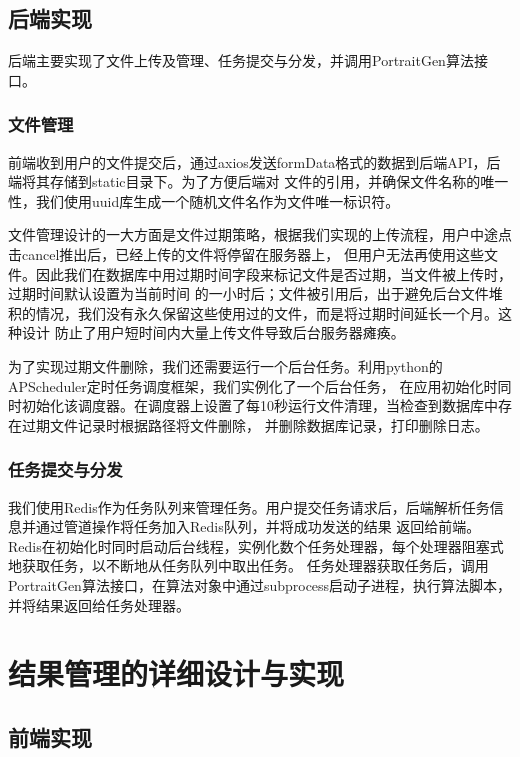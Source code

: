 \subsection{后端实现}

后端主要实现了文件上传及管理、任务提交与分发，并调用PortraitGen算法接口。

\subsubsection{文件管理}

前端收到用户的文件提交后，通过axios发送formData格式的数据到后端API，后端将其存储到static目录下。为了方便后端对
文件的引用，并确保文件名称的唯一性，我们使用uuid库生成一个随机文件名作为文件唯一标识符。

文件管理设计的一大方面是文件过期策略，根据我们实现的上传流程，用户中途点击cancel推出后，已经上传的文件将停留在服务器上，
但用户无法再使用这些文件。因此我们在数据库中用过期时间字段来标记文件是否过期，当文件被上传时，过期时间默认设置为当前时间
的一小时后；文件被引用后，出于避免后台文件堆积的情况，我们没有永久保留这些使用过的文件，而是将过期时间延长一个月。这种设计
防止了用户短时间内大量上传文件导致后台服务器瘫痪。

为了实现过期文件删除，我们还需要运行一个后台任务。利用python的APScheduler定时任务调度框架，我们实例化了一个后台任务，
在应用初始化时同时初始化该调度器。在调度器上设置了每10秒运行文件清理，当检查到数据库中存在过期文件记录时根据路径将文件删除，
并删除数据库记录，打印删除日志。

\subsubsection{任务提交与分发}

我们使用Redis作为任务队列来管理任务。用户提交任务请求后，后端解析任务信息并通过管道操作将任务加入Redis队列，并将成功发送的结果
返回给前端。Redis在初始化时同时启动后台线程，实例化数个任务处理器，每个处理器阻塞式地获取任务，以不断地从任务队列中取出任务。
任务处理器获取任务后，调用PortraitGen算法接口，在算法对象中通过subprocess启动子进程，执行算法脚本，并将结果返回给任务处理器。

\section{结果管理的详细设计与实现}

\subsection{前端实现}

